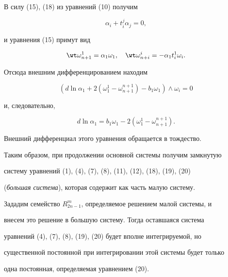  


В силу (15), (18) из уравнений (10) получим 


$$ 


\alpha_i+t^j_i\alpha_j=0, 


$$ 


и уравнения (15) примут вид 


\begin{equation} 


\wt\omega^1_{n+1}=\alpha_1\omega_1,\quad 


\wt\omega^i_{n+i}=-\alpha_1t^1_i\omega_i. 


\end{equation} 


Отсюда внешним дифференцированием находим 


$$ 


(d\ln\alpha_1+2(\omega^1_1-\omega^{n+1}_{n+1}) 


-b_1\omega_1)\wedge\omega_i=0 


$$ 


и, следовательно, 


\begin{equation} 


d\ln\alpha_1=b_1\omega_1-2(\omega^1_1-\omega^{n+1}_{n+1}). 


\end{equation} 


Внешний дифференциал этого уравнения обращается в тождество. 


 


Таким образом, при продолжении основной системы получим замкнутую 


систему уравнений (1), (4), (7), (8), (11), (12), (18), (19), (20) 


({\it большая система}), которая содержит как часть малую систему. 


 


Зададим семейство $R^m_{2n-1}$, определяемое решением малой системы, и 


внесем это решение в большую систему. Тогда оставшаяся система 


уравнений (4), (7), (8), (19), (20) будет вполне интегрируемой, но 


существенной постоянной при интегрировании этой системы будет только 


одна постоянная, определяемая уравнением (20). 


